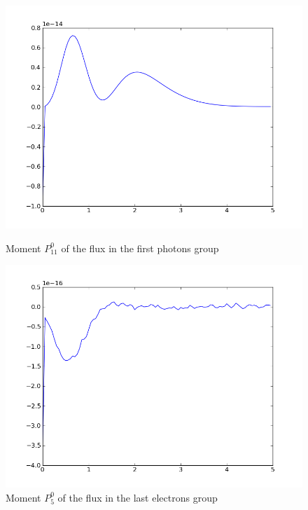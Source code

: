 \begin{figure}[H]
\begin{minipage}[b]{0.45\linewidth}
\centering
\includegraphics[width=\linewidth]{./images/al/group_0_moment_142}
\caption{Moment $P_{11}^0$ of the flux in the first photons group}
\end{minipage}
\hspace{0.5cm}
\begin{minipage}[b]{0.45\linewidth}
\centering
\includegraphics[width=\linewidth]{./images/al/group_39_moment_142}
\caption{Moment $P_5^0$ of the flux in the last electrons group}
\end{minipage}
\end{figure}

